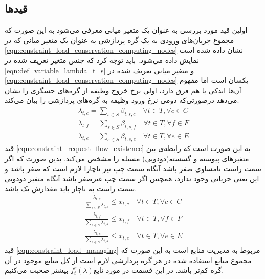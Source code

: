     \subsection{قیدها}
    اولین قید مورد بررسی به عنوان یک متغیر میانی معرفی می‌شود به این صورت که مجموع جریان‌های ورودی به یک گره پردازشی به عنوان یک متغیر میانی که در \cref{eqn:constraint_load_conservation_computing_nodes} نشان داده شده است نمایش داده می‌شود. باید توجه کرد که جنس متغیر تعریف شده در \cref{eqn:def_variable_lambda_t_s} و متغیر میانی تعریف شده در \cref{eqn:constraint_load_conservation_computing_nodes} یکسان است اما مفهوم آن‌ها اندکی با هم فرق دارد، اولی نرخ خروج وظیفه از گره‌های حسگری را نشان می‌دهد درصورتی‌که دومی نرخ ورود وظیفه به گره‌های پردازشی را بیان می‌کند. 
    \begin{subequations}\label{eqn:constraint_load_conservation_computing_nodes}
    	\begin{align}
    	\lambda_{t,c} = \sum_{s\in S}\beta_{t,s,c} \quad \forall{t \in T}, \forall{c \in C} \\
    	\lambda_{t,f} = \sum_{s\in S}\beta_{t,s,f} \quad \forall{t \in T}, \forall{f \in F} \\
    	\lambda_{t,e} = \sum_{s\in S}\beta_{t,s,e} \quad \forall{t \in T}, \forall{e \in E}
    	\end{align}
    \end{subequations}
	قید \cref{eqn:constraint_request_flow_existence} به این صورت است که رابطه‌ی بین متغیرهای پیوسته و گسسته(دودویی) مسئله را مشخص می‌کند. بدین صورت که اگر سمت راست نامساوی صفر باشد آنگاه سمت چپ نیز ناچارا لازم است که صفر باشد و این یعنی جریانی وجود ندارد، همچنین اگر سمت چپ غیرصفر باشد آنگاه متغیر دودویی سمت راست به ناچار باید مقدارش یک باشد. 
	\begin{subequations}\label{eqn:constraint_request_flow_existence}
		\begin{align}
		\frac{\lambda_{t,c}}{\sum_{s\in S}\lambda_{t,s}} \le x_{t,c} \quad \forall{t \in T}, \forall{c \in C} \\
		\frac{\lambda_{t,f}}{\sum_{s\in S}\lambda_{t,s}} \le x_{t,f} \quad \forall{t \in T}, \forall{f \in F} \\
		\frac{\lambda_{t,e}}{\sum_{s\in S}\lambda_{t,s}} \le x_{t,e} \quad \forall{t \in T}, \forall{e \in E}
		\end{align}
	\end{subequations}
	قید \cref{eqn:constraint_load_managing} مربوط به مدیریت منابع است به این‌ صورت که مجموع منابع استفاده شده در هر گره پردازشی لازم است از کل منابع موجود در آن گره کم‌تر باشد. در این قسمت در مورد تابع$f_t^r(\lambda)$ بیشتر صحبت می‌کنیم.
